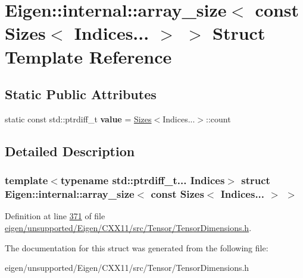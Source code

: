 \hypertarget{struct_eigen_1_1internal_1_1array__size_3_01const_01_sizes_3_01_indices_8_8_8_01_4_01_4}{}\section{Eigen\+:\+:internal\+:\+:array\+\_\+size$<$ const Sizes$<$ Indices... $>$ $>$ Struct Template Reference}
\label{struct_eigen_1_1internal_1_1array__size_3_01const_01_sizes_3_01_indices_8_8_8_01_4_01_4}
\subsection*{Static Public Attributes}
\begin{DoxyCompactItemize}
\item 
\mbox{\label{struct_eigen_1_1internal_1_1array__size_3_01const_01_sizes_3_01_indices_8_8_8_01_4_01_4_a272b93396ff4c0d46a5da13937974848}} 
static const std\+::ptrdiff\+\_\+t {\bfseries value} = \hyperlink{struct_eigen_1_1_sizes}{Sizes}$<$Indices...$>$\+::count
\end{DoxyCompactItemize}


\subsection{Detailed Description}
\subsubsection*{template$<$typename std\+::ptrdiff\+\_\+t... Indices$>$\newline
struct Eigen\+::internal\+::array\+\_\+size$<$ const Sizes$<$ Indices... $>$ $>$}



Definition at line \hyperlink{eigen_2unsupported_2_eigen_2_c_x_x11_2src_2_tensor_2_tensor_dimensions_8h_source_l00371}{371} of file \hyperlink{eigen_2unsupported_2_eigen_2_c_x_x11_2src_2_tensor_2_tensor_dimensions_8h_source}{eigen/unsupported/\+Eigen/\+C\+X\+X11/src/\+Tensor/\+Tensor\+Dimensions.\+h}.



The documentation for this struct was generated from the following file\+:\begin{DoxyCompactItemize}
\item 
eigen/unsupported/\+Eigen/\+C\+X\+X11/src/\+Tensor/\+Tensor\+Dimensions.\+h\end{DoxyCompactItemize}
